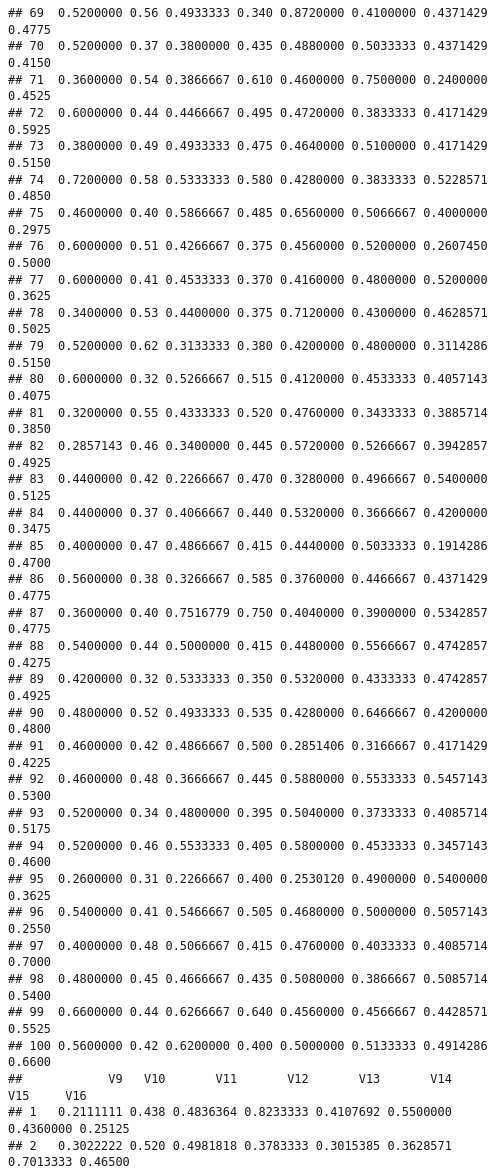 \documentclass[
]{article}
\begin{document}
\begin{verbatim}
## 69  0.5200000 0.56 0.4933333 0.340 0.8720000 0.4100000 0.4371429 0.4775
## 70  0.5200000 0.37 0.3800000 0.435 0.4880000 0.5033333 0.4371429 0.4150
## 71  0.3600000 0.54 0.3866667 0.610 0.4600000 0.7500000 0.2400000 0.4525
## 72  0.6000000 0.44 0.4466667 0.495 0.4720000 0.3833333 0.4171429 0.5925
## 73  0.3800000 0.49 0.4933333 0.475 0.4640000 0.5100000 0.4171429 0.5150
## 74  0.7200000 0.58 0.5333333 0.580 0.4280000 0.3833333 0.5228571 0.4850
## 75  0.4600000 0.40 0.5866667 0.485 0.6560000 0.5066667 0.4000000 0.2975
## 76  0.6000000 0.51 0.4266667 0.375 0.4560000 0.5200000 0.2607450 0.5000
## 77  0.6000000 0.41 0.4533333 0.370 0.4160000 0.4800000 0.5200000 0.3625
## 78  0.3400000 0.53 0.4400000 0.375 0.7120000 0.4300000 0.4628571 0.5025
## 79  0.5200000 0.62 0.3133333 0.380 0.4200000 0.4800000 0.3114286 0.5150
## 80  0.6000000 0.32 0.5266667 0.515 0.4120000 0.4533333 0.4057143 0.4075
## 81  0.3200000 0.55 0.4333333 0.520 0.4760000 0.3433333 0.3885714 0.3850
## 82  0.2857143 0.46 0.3400000 0.445 0.5720000 0.5266667 0.3942857 0.4925
## 83  0.4400000 0.42 0.2266667 0.470 0.3280000 0.4966667 0.5400000 0.5125
## 84  0.4400000 0.37 0.4066667 0.440 0.5320000 0.3666667 0.4200000 0.3475
## 85  0.4000000 0.47 0.4866667 0.415 0.4440000 0.5033333 0.1914286 0.4700
## 86  0.5600000 0.38 0.3266667 0.585 0.3760000 0.4466667 0.4371429 0.4775
## 87  0.3600000 0.40 0.7516779 0.750 0.4040000 0.3900000 0.5342857 0.4775
## 88  0.5400000 0.44 0.5000000 0.415 0.4480000 0.5566667 0.4742857 0.4275
## 89  0.4200000 0.32 0.5333333 0.350 0.5320000 0.4333333 0.4742857 0.4925
## 90  0.4800000 0.52 0.4933333 0.535 0.4280000 0.6466667 0.4200000 0.4800
## 91  0.4600000 0.42 0.4866667 0.500 0.2851406 0.3166667 0.4171429 0.4225
## 92  0.4600000 0.48 0.3666667 0.445 0.5880000 0.5533333 0.5457143 0.5300
## 93  0.5200000 0.34 0.4800000 0.395 0.5040000 0.3733333 0.4085714 0.5175
## 94  0.5200000 0.46 0.5533333 0.405 0.5800000 0.4533333 0.3457143 0.4600
## 95  0.2600000 0.31 0.2266667 0.400 0.2530120 0.4900000 0.5400000 0.3625
## 96  0.5400000 0.41 0.5466667 0.505 0.4680000 0.5000000 0.5057143 0.2550
## 97  0.4000000 0.48 0.5066667 0.415 0.4760000 0.4033333 0.4085714 0.7000
## 98  0.4800000 0.45 0.4666667 0.435 0.5080000 0.3866667 0.5085714 0.5400
## 99  0.6600000 0.44 0.6266667 0.640 0.4560000 0.4566667 0.4428571 0.5525
## 100 0.5600000 0.42 0.6200000 0.400 0.5000000 0.5133333 0.4914286 0.6600
##            V9   V10       V11       V12       V13       V14       V15     V16
## 1   0.2111111 0.438 0.4836364 0.8233333 0.4107692 0.5500000 0.4360000 0.25125
## 2   0.3022222 0.520 0.4981818 0.3783333 0.3015385 0.3628571 0.7013333 0.46500

\end{verbatim}
\end{document}
